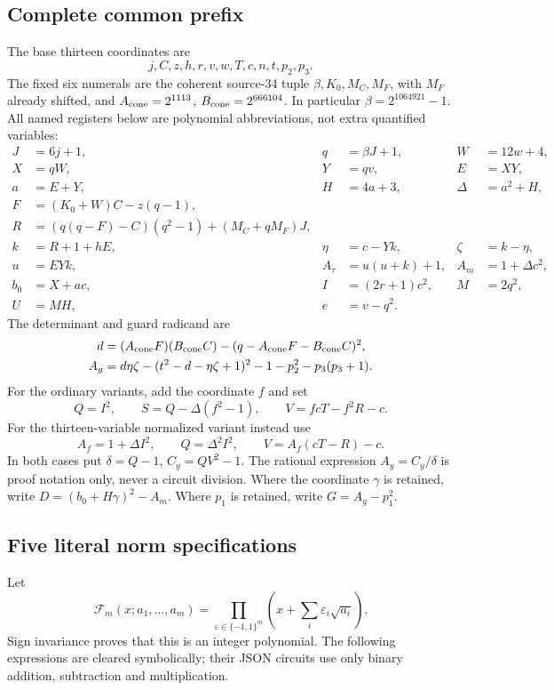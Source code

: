 \documentclass[11pt]{article}
\begin{document}
\subsection{Complete common prefix}
The base thirteen coordinates are
\[
 j,C,z,h,r,v,w,T,c,n,t,p_2,p_3.
\]
The fixed six numerals are the coherent source-34 tuple
$\beta,K_0,M_C,M_F$, with $M_F$ already shifted, and
$A_{\rm cone}=2^{1113}$, $B_{\rm cone}=2^{666104}$.
In particular $\beta=2^{1064921}-1$. All named registers below are
polynomial abbreviations, not extra quantified variables:
\begin{align*}
J&=6j+1,&q&=\beta J+1,&W&=12w+4,\\
X&=qW,&Y&=qv,&E&=XY,\\
a&=E+Y,&H&=4a+3,&\Delta&=a^2+H,\\
F&=(K_0+W)C-z(q-1),&&&\\
R&=(q(q-F)-C)(q^2-1)+(M_C+qM_F)J,&&&\\
k&=R+1+hE,&\eta&=c-Yk,&\zeta&=k-\eta,\\
u&=EYk,&A_\tau&=u(u+k)+1,&A_m&=1+\Delta c^2,\\
b_0&=X+ac,&I&=(2r+1)c^2,&M&=2q^2,\\
U&=MH,&e&=v-q^2.&&
\end{align*}
The determinant and guard radicand are
\begin{align*}
d&=(A_{\rm cone}F)(B_{\rm cone}C)
 -(q-A_{\rm cone}F-B_{\rm cone}C)^2,\\
A_g&=d\eta\zeta-(t^2-d-\eta\zeta+1)^2
     -1-p_2^2-p_3(p_3+1).
\end{align*}
For the ordinary variants, add the coordinate $f$ and set
\[
 Q=I^2,\qquad S=Q-\Delta(f^2-1),\qquad
 V=fcT-f^2R-c.
\]
For the thirteen-variable normalized variant instead use
\[
 A_f=1+\Delta I^2,\qquad Q=\Delta^2I^2,\qquad
 V=A_f(cT-R)-c.
\]
In both cases put $\delta=Q-1$, $C_y=QV^2-1$. The rational expression
$A_y=C_y/\delta$ is proof notation only, never a circuit division.
Where the coordinate $\gamma$ is retained, write
$D=(b_0+H\gamma)^2-A_m$. Where $p_1$ is retained, write
$G=A_g-p_1^2$.

\subsection{Five literal norm specifications}
Let
\[
 \mathcal F_m(x;a_1,\ldots,a_m)
 =\prod_{\varepsilon\in\{-1,1\}^m}
   \left(x+\sum_i\varepsilon_i\sqrt{a_i}\right).
\]
Sign invariance proves that this is an integer polynomial. The following
expressions are cleared symbolically; their JSON circuits use only binary
addition, subtraction and multiplication.
\end{document}
